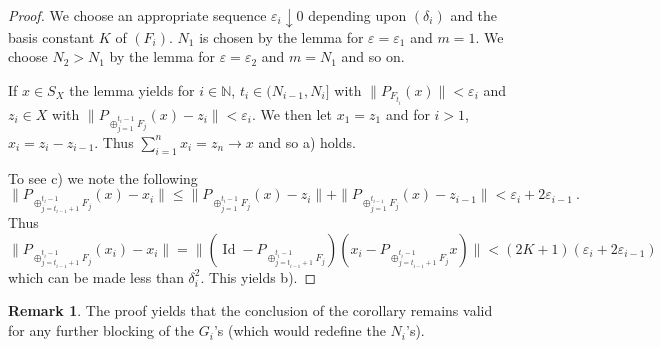 \documentclass[11pt,leqno]{amsart}
\theoremstyle{definition}
\newtheorem*{remark}{Remark}
\newcommand{\vp}{\varepsilon}
\newcommand{\Id}{\operatorname{Id}}
\newcommand{\N}{\mathbb{N}}
\begin{document}
\begin{proof} 
We choose an appropriate sequence $\vp_i\downarrow0$ depending upon 
$(\delta_i)$ and the basis constant $K$ of $(F_i)$. 
$N_1$ is chosen by the lemma for $\vp = \vp_1$ and $m=1$. 
We choose $N_2 >N_1$ by the lemma for $\vp=\vp_2$ and $m=N_1$ and so on. 

If $x\in S_X$ the lemma yields for $i\in\N$, $t_i\in (N_{i-1},N_i]$ with 
$\|P_{F_{t_i}} (x)\| <\vp_i$ and $z_i\in X$ with 
$\|P_{\oplus_{j=1}^{t_i-1} F_j} (x) - z_i\|<\vp_i$. 
We then let $x_1 =z_1$ and for $i>1$, $x_i = z_i-z_{i-1}$. 
Thus $\sum_{i=1}^n x_i = z_n \to x$ and so a) holds. 

To see c) we note the following 
\begin{equation*}
\|P_{\oplus_{j=t_{i-1}+1}^{t_i-1} F_j} (x) - x_i\| 
 \le \|P_{\oplus_{j=1}^{t_i-1} F_j} (x) - z_i\| 
  + \|P_{\oplus_{j=1}^{t_{i-1}}F_j} (x) - z_{i-1}\| 
< \vp_i + 2\vp_{i-1}\ .
\end{equation*}
Thus 
$$\|P_{\oplus_{j=t_{i-1}+1}^{t_i-1}F_j} (x_i) - x_i\| 
= \|(\Id - P_{\oplus_{j=t_{i-1}+1}^{t_i-1}F_j} ) 
(x_i - P_{\oplus_{j=t_{i-1}+1}^{t_i-1} F_j} x)\| 
< (2K+1) (\vp_i + 2\vp_{i-1})$$
which can be made less than $\delta_i^2$. 
This yields b).
\end{proof} 

\begin{remark} 
The proof yields that the conclusion of the corollary remains valid 
for any further blocking of the $G_i$'s (which would redefine the $N_i$'s). 
\end{remark}
\end{document}
